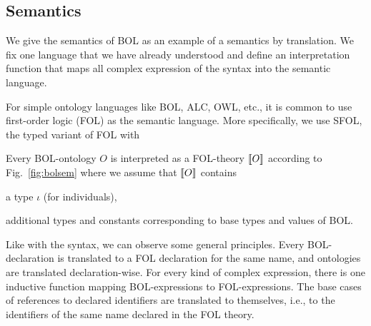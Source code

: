\subsection{Semantics}

We give the semantics of BOL as an example of a semantics by translation.
We fix one language that we have already understood and define an interpretation function that maps all complex expression of the syntax into the semantic language.

For simple ontology languages like BOL, ALC, OWL, etc., it is common to use first-order logic (FOL) as the semantic language.
More specifically, we use SFOL, the typed variant of FOL with
\begin{definition}
Every BOL-ontology $O$ is interpreted as a FOL-theory $\llbracket O\rrbracket$ according to Fig.~\ref{fig:bolsem} where we assume that $\llbracket O\rrbracket$ contains
\begin{compactitem}
 \item a type $\iota$ (for individuals),
 \item additional types and constants corresponding to base types and values of BOL.
\end{compactitem}
\end{definition}

Like with the syntax, we can observe some general principles.
Every BOL-declaration is translated to a FOL declaration for the same name, and ontologies are translated declaration-wise.
For every kind of complex expression, there is one inductive function mapping BOL-expressions to FOL-expressions.
The base cases of references to declared identifiers are translated to themselves, i.e., to the identifiers of the same name declared in the FOL theory.

